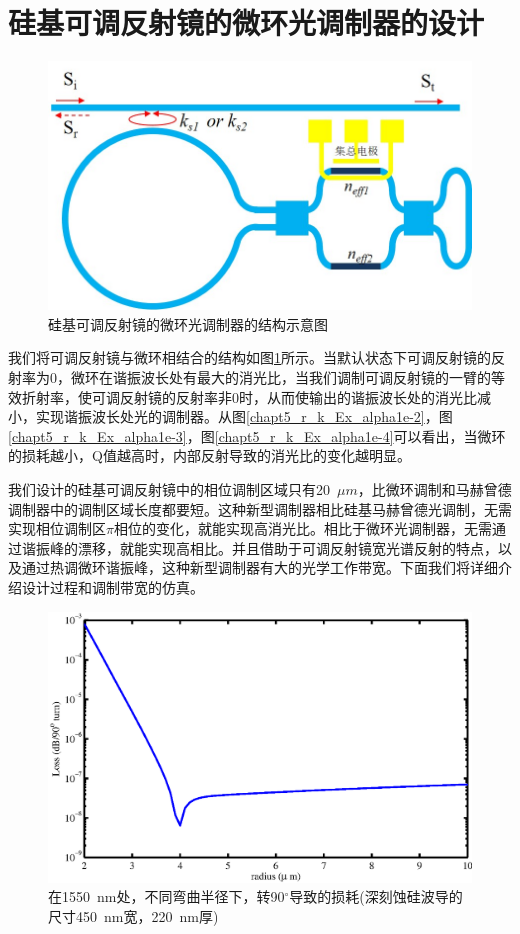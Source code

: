 \section{硅基可调反射镜的微环光调制器的设计}
\begin{figure}[htb]
	\centering
	\includegraphics[width=12cm]{./Pictures/chapt5_tunable_reflection_ring_structure.jpg}
	\caption{硅基可调反射镜的微环光调制器的结构示意图}
	\label{chapt5_tunable_reflection_ring_structure}
\end{figure}
我们将可调反射镜与微环相结合的结构如图\ref{chapt5_tunable_reflection_ring_structure}所示。当默认状态下可调反射镜的反射率为0，微环在谐振波长处有最大的消光比，当我们调制可调反射镜的一臂的等效折射率，使可调反射镜的反射率非0时，从而使输出的谐振波长处的消光比减小，实现谐振波长处光的调制器。从图\ref{chapt5_r_k_Ex_alpha1e-2}，图\ref{chapt5_r_k_Ex_alpha1e-3}，图\ref{chapt5_r_k_Ex_alpha1e-4}可以看出，当微环的损耗越小，Q值越高时，内部反射导致的消光比的变化越明显。

我们设计的硅基可调反射镜中的相位调制区域只有20~$\mu m$，比微环调制和马赫曾德调制器中的调制区域长度都要短。这种新型调制器相比硅基马赫曾德光调制，无需实现相位调制区$\pi$相位的变化，就能实现高消光比。相比于微环光调制器，无需通过谐振峰的漂移，就能实现高相比。并且借助于可调反射镜宽光谱反射的特点，以及通过热调微环谐振峰，这种新型调制器有大的光学工作带宽。下面我们将详细介绍设计过程和调制带宽的仿真。

\begin{figure}[htb]
	\centering
	\includegraphics[width=12cm]{./Pictures/chapt5_deep_si_bend_loss.eps}
	\caption{在1550~nm处，不同弯曲半径下，转90$^\circ$导致的损耗(深刻蚀硅波导的尺寸450~nm宽，220~nm厚)}
	\label{chapt5_deep_si_bend_loss}
\end{figure}

